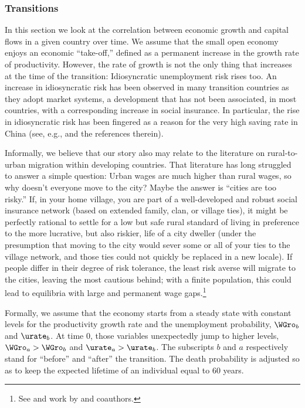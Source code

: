 \documentclass[titlepage]{\econtex}\newcommand{\texname}{cjSOE}
\begin{document}
\subsubsection{Transitions}

In this section we look at the correlation between economic growth and
capital flows in a given country over time. We assume that the small
open economy enjoys an economic ``take-off,'' defined as a permanent
increase in the growth rate of productivity. However, the rate of
growth is not the only thing that increases at the time of the
transition: Idiosyncratic unemployment risk rises too. An increase in
idiosyncratic risk has been observed in many transition countries as
they adopt market systems, a development that has not been associated,
in most countries, with a corresponding increase in social
insurance. In particular, the rise in idiosyncratic risk has been
fingered as a reason for the very high saving rate in China (see,
e.g., \cite{cpChina} and the references therein).

Informally, we believe that our story also may relate to the
literature on rural-to-urban migration within developing countries.
That literature has long struggled to answer a simple question: Urban
wages are much higher than rural wages, so why doesn't everyone move
to the city?  Maybe the answer is ``cities are too risky.''  If, in
your home village, you are part of a well-developed and robust social
insurance network (based on extended family, clan, or village ties),
it might be perfectly rational to settle for a low but safe rural
standard of living in preference to the more lucrative, but also
riskier, life of a city dweller (under the presumption that moving
to the city would sever some or all of your ties to the village
network, and those ties could not quickly be replaced in a new
locale).  If people differ in their degree of risk tolerance, the
least risk averse will migrate to the cities, leaving the most
cautious behind; with a finite population, this could lead to equilibria
with large and permanent wage gaps.\footnote{See \cite{mrMobilityIndia} and
  work by \cite{townsendIndia} and coauthors.}

Formally, we assume that the economy starts from a steady state with
constant levels for the productivity growth rate and the unemployment
probability, $\WGro_b$ and $\urate_b$. At time $0$, those variables
unexpectedly jump to higher levels, $\WGro_a > \WGro_b$ and $\urate_a
> \urate_b$. The subscripts $b$ and $a$ respectively stand for
``before'' and ``after'' the transition. The death probability is
adjusted so as to keep the expected lifetime of an individual equal to
60 years.
\end{document}
